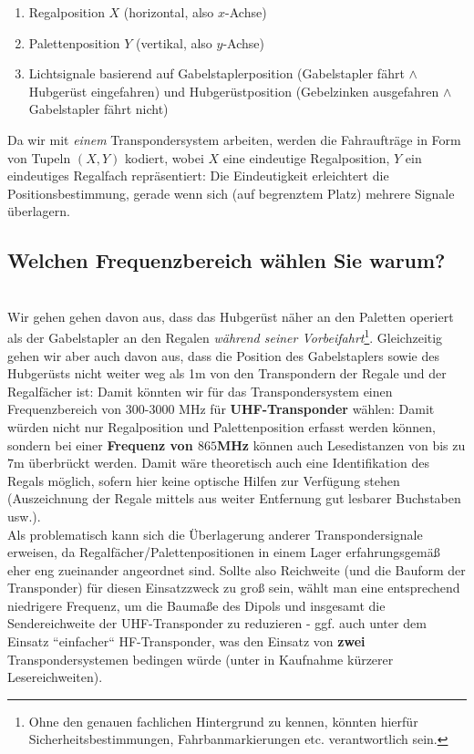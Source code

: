 \begin{enumerate}
    \itemsep0.5em
    \item Regalposition $X$ (horizontal, also $x$-Achse)
    \item Palettenposition $Y$ (vertikal, also $y$-Achse)
    \item Lichtsignale basierend auf Gabelstaplerposition (Gabelstapler fährt $\land$ Hubgerüst eingefahren) und Hubgerüstposition (Gebelzinken ausgefahren $\land$ Gabelstapler fährt nicht)
\end{enumerate}

\noindent
Da wir mit \textit{einem} Transpondersystem arbeiten, werden die Fahraufträge in Form von Tupeln $(X, Y)$ kodiert, wobei $X$ eine eindeutige Regalposition, $Y$ ein eindeutiges Regalfach repräsentiert: Die Eindeutigkeit erleichtert die Positionsbestimmung, gerade wenn sich (auf begrenztem Platz) mehrere Signale überlagern.\\



\subsection*{Welchen Frequenzbereich wählen Sie warum?}\\
Wir gehen gehen davon aus, dass das Hubgerüst näher an den Paletten operiert als der Gabelstapler an den Regalen \textit{während seiner Vorbeifahrt}\footnote{
    Ohne den genauen fachlichen Hintergrund zu kennen, könnten hierfür Sicherheitsbestimmungen, Fahrbanmarkierungen etc. verantwortlich sein.
}.
Gleichzeitig gehen wir aber auch davon aus, dass die Position des Gabelstaplers sowie des Hubgerüsts nicht weiter weg als 1m von den Transpondern der Regale und der Regalfächer ist: Damit könnten wir für das Transpondersystem einen Frequenzbereich von 300-3000 MHz für \textbf{UHF-Transponder} wählen: Damit würden nicht nur Regalposition und Palettenposition erfasst werden können, sondern bei einer \textbf{Frequenz von $865$MHz} können auch Lesedistanzen von bis zu $7$m überbrückt werden.
Damit wäre theoretisch auch eine Identifikation des Regals möglich, sofern hier keine optische Hilfen zur Verfügung stehen (Auszeichnung der Regale mittels aus weiter Entfernung gut lesbarer Buchstaben usw.).\\

\noindent
Als problematisch kann sich die Überlagerung anderer Transpondersignale erweisen, da Regalfächer/Palettenpositionen in einem Lager erfahrungsgemäß eher eng zueinander angeordnet sind.
Sollte also Reichweite (und die Bauform der Transponder) für diesen Einsatzzweck zu groß sein, wählt man eine entsprechend niedrigere Frequenz, um die Baumaße des Dipols und insgesamt die Sendereichweite der UHF-Transponder zu reduzieren - ggf. auch unter dem Einsatz ``einfacher`` HF-Transponder, was den Einsatz von \textbf{zwei} Transpondersystemen bedingen würde (unter in Kaufnahme kürzerer Lesereichweiten).\\

